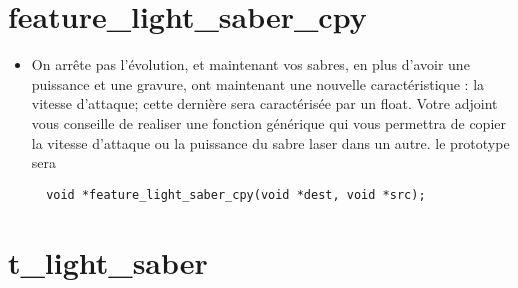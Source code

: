 \documentclass{koala-en}
\begin{document}
\chapter{feature\_light\_saber\_cpy}

\begin{itemize}
  \item
On arrête pas l'évolution, et maintenant vos sabres, en plus d'avoir une puissance et une gravure, ont maintenant une nouvelle caractéristique : la vitesse d'attaque;
cette dernière sera caractérisée par un float.
Votre adjoint vous conseille de realiser une fonction générique qui vous permettra de copier la vitesse d'attaque ou la puissance du sabre laser dans un autre.
le prototype sera 
\begin{lstlisting}
  void *feature_light_saber_cpy(void *dest, void *src);
\end{lstlisting}
\end{itemize}
\newpage

\chapter{t\_light\_saber}

\end{document}
